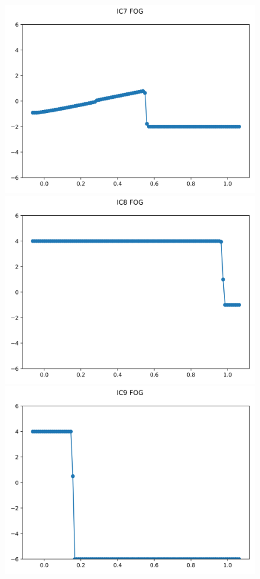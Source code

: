 \documentclass{article}
\begin{document}
\begin{figure}[t]
        \centering
        \includegraphics[width=.95\textwidth]{../../code/hires_IC7Methodfu_plot.png}
        \includegraphics[width=.95\textwidth]{../../code/hires_IC8Methodfu_plot.png}
        \includegraphics[width=.95\textwidth]{../../code/hires_IC9Methodfu_plot.png}

\end{figure}
\end{document}
